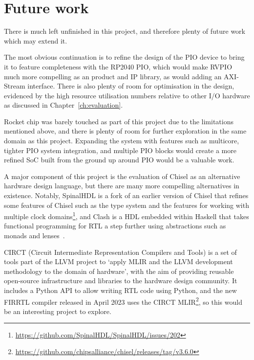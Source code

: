 \section{Future work}

There is much left unfinished in this project, and therefore plenty of future work which may extend it.

The most obvious continuation is to refine the design of the PIO device to bring it to feature completeness with the RP2040 PIO, which would make RVPIO much more compelling as an product and IP library, as would adding an AXI-Stream interface. There is also plenty of room for optimisation in the design, evidenced by the high resource utilisation numbers relative to other I/O hardware as discussed in Chapter~\ref{ch:evaluation}.

Rocket chip was barely touched as part of this project due to the limitations mentioned above, and there is plenty of room for further exploration in the same domain as this project. Expanding the system with features such as multicore, tighter PIO system integration, and multiple PIO blocks would create a more refined SoC built from the ground up around PIO would be a valuable work.

A major component of this project is the evaluation of Chisel as an alternative hardware design language, but there are many more compelling alternatives in existence. Notably, SpinalHDL is a fork of an earlier version of Chisel that refines some features of Chisel such as the type system and the features for working with multiple clock domains\footnote{\url{https://github.com/SpinalHDL/SpinalHDL/issues/202}}, and Clash is a HDL embedded within Haskell that takes functional programming for RTL a step further using abstractions such as monads and lenses~\cite{clash}.

CIRCT (Circuit Intermediate Representation Compilers and Tools) is a set of tools part of the LLVM project to `apply MLIR and the LLVM development methodology to the domain of hardware', with the aim of providing reusable open-source infrastructure and libraries to the hardware design community. It includes a Python API to allow writing RTL code using Python, and the new FIRRTL compiler released in April 2023 uses the CIRCT MLIR\footnote{\url{https://github.com/chipsalliance/chisel/releases/tag/v3.6.0}}, so this would be an interesting project to explore.
